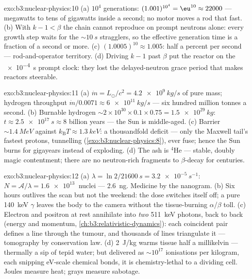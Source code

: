 \begin{solution}{exo:b3:nuclear-physics:10}
(a) $10^4$ generations: $(1.001)^{10^4} = \eu^{10} \approx
22000$ --- megawatts to tens of gigawatts inside a second; no
motor moves a rod that fast. (b) With $k - 1 < \beta$ the chain
cannot reproduce on prompt neutrons alone: every growth step
waits for the ${\sim}\qty{10}{s}$ stragglers, so the effective
generation time is a fraction of a second or more. (c)
$(1.0005)^{10} \approx 1.005$: half a percent per second ---
rod-and-operator territory. (d) Driving $k - 1$ past $\beta$
put the reactor on the \qty{e-4}{s} prompt clock: they lost the
delayed-neutron grace period that makes reactors steerable.
\end{solution}

\begin{solution}{exo:b3:nuclear-physics:11}
(a) $\dot m = L_\odot/c^2 = \qty{4.2e9}{kg/s}$ of pure mass;
hydrogen throughput $\dot m/0.0071 \approx \qty{6e11}{kg/s}$ ---
six hundred million tonnes a second. (b) Burnable hydrogen
${\sim}2\times10^{30}\times0.1\times0.75 = \qty{1.5e29}{kg}$:
$t \approx \qty{2.5e17}{s} \approx 8$ billion years --- the Sun
is middle-aged. (c) Barrier ${\sim}\qty{1.4}{MeV}$ against
$k_{\text{B}}T \approx \qty{1.3}{keV}$: a thousandfold deficit
--- only the Maxwell tail's fastest protons, tunnelling
(\cref{exo:b3:nuclear-physics:8}), ever fuse; hence the Sun
burns for gigayears instead of exploding. (d) The ash is
$^4$He --- stable, doubly magic contentment; there are no
neutron-rich fragments to $\beta$-decay for centuries.
\end{solution}

\begin{solution}{exo:b3:nuclear-physics:12}
(a) $\lambda = \ln2/\qty{21600}{s} = \qty{3.2e-5}{s^{-1}}$:
$N = \mathcal A/\lambda = \qty{1.6e13}{}$ nuclei ---
\qty{2.6}{ng}. Medicine by the nanogram. (b) Six hours outlives
the scan but not the weekend: the dose switches itself off; a
pure \qty{140}{keV} $\gamma$ leaves the body to the camera
without the tissue-burning $\alpha$/$\beta$ toll. (c) Electron
and positron at rest annihilate into \emph{two}
\qty{511}{keV} photons, back to back (energy and momentum,
\cref{ch:b3:relativistic-dynamics}): each coincident pair
defines a line through the tumour, and thousands of lines
triangulate it --- tomography by conservation law. (d)
\qty{2}{J/kg} warms tissue half a millikelvin --- thermally a
sip of tepid water; but delivered as ${\sim}10^{17}$ ionisations
per kilogram, each snipping \unit{eV}-scale chemical bonds, it
is chemistry-lethal to a dividing cell. Joules measure heat;
grays measure sabotage.
\end{solution}

